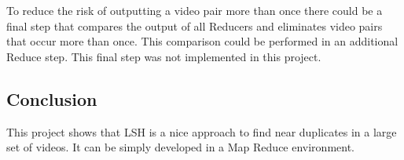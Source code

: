 \documentclass[a4paper, 11pt]{article}
\begin{document}
To reduce the risk of outputting a video pair more than once there could be a final step that compares the output of all Reducers and eliminates video pairs that occur more than once. This comparison could be performed in an additional Reduce step. This final step was not implemented in this project.

\subsection{Conclusion}

This project shows that LSH is a nice approach to find near duplicates in a large set of videos. It can be simply developed in a Map Reduce environment.
\end{document}
